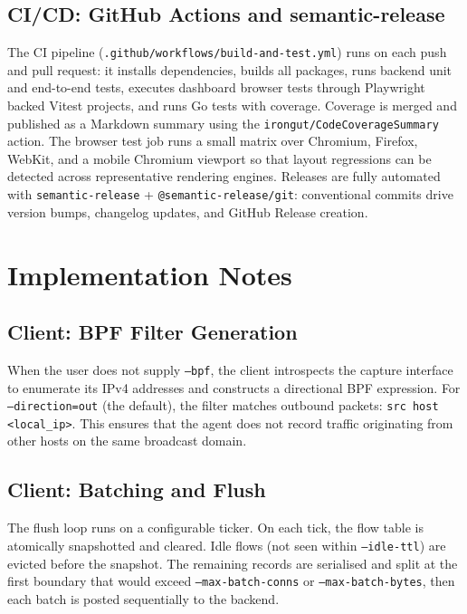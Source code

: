 \documentclass[12pt]{report}
\begin{document}
\section{CI/CD: GitHub Actions and semantic-release}

The CI pipeline (\texttt{.github/workflows/build-and-test.yml}) runs on each push and pull
request: it installs dependencies, builds all packages, runs backend unit and end-to-end
tests, executes dashboard browser tests through Playwright backed Vitest projects, and runs
Go tests with coverage. Coverage is merged and published as a Markdown summary using the
\texttt{irongut/CodeCoverageSummary} action. The browser test job runs a small matrix over
Chromium, Firefox, WebKit, and a mobile Chromium viewport so that layout regressions can be
detected across representative rendering engines. Releases are fully automated with
\texttt{semantic-release} + \texttt{@semantic-release/git}: conventional commits drive
version bumps, changelog updates, and GitHub Release creation.

\chapter{Implementation Notes}
\label{ch:implementation}

\section{Client: BPF Filter Generation}

When the user does not supply \texttt{--bpf}, the client introspects the capture interface
to enumerate its IPv4 addresses and constructs a directional BPF expression. For
\texttt{--direction=out} (the default), the filter matches outbound packets:
\texttt{src host <local\_ip>}. This ensures that the agent does not record traffic
originating from other hosts on the same broadcast domain.

\section{Client: Batching and Flush}

The flush loop runs on a configurable ticker. On each tick, the flow table is atomically
snapshotted and cleared. Idle flows (not seen within \texttt{--idle-ttl}) are evicted before
the snapshot. The remaining records are serialised and split at the first boundary that would
exceed \texttt{--max-batch-conns} or \texttt{--max-batch-bytes}, then each batch is posted
sequentially to the backend.
\end{document}
